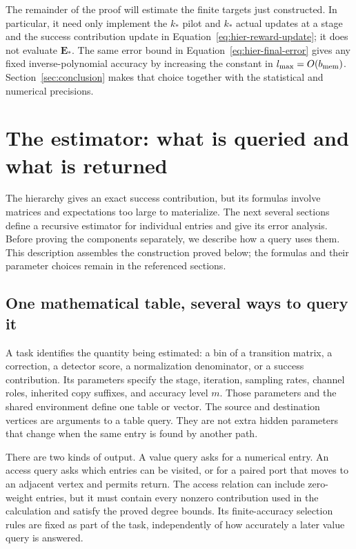 \documentclass[11pt]{article}
\numberwithin{equation}{section}
\theoremstyle{definition}
\theoremstyle{remark}
\begin{document}
The remainder of the proof will estimate the finite targets just
constructed.  In particular, it need only implement the $k_*$ pilot and
$k_*$ actual updates at a stage and the success contribution update in
Equation~\eqref{eq:hier-reward-update}; it does not evaluate ${\mathbf{E}}_*$.
The same error bound in Equation~\eqref{eq:hier-final-error} gives any
fixed inverse-polynomial accuracy by increasing the constant in
${l_{\rm max}}=O({b_{\rm mem}})$.  Section~\ref{sec:conclusion} makes that choice together with
the statistical and numerical precisions.





\section{The estimator: what is queried and what is returned}
\label{sec:estimator-description}

The hierarchy gives an exact success contribution, but its formulas involve matrices and expectations too large to materialize. The next several sections define a recursive estimator for individual entries and give its error analysis. Before proving the components separately, we describe how a query uses them. This description assembles the construction proved below; the formulas and their parameter choices remain in the referenced sections.

\subsection{One mathematical table, several ways to query it}

A task identifies the quantity being estimated: a bin of a transition matrix, a correction, a detector score, a normalization denominator, or a success contribution. Its parameters specify the stage, iteration, sampling rates, channel roles, inherited copy suffixes, and accuracy level ${m}$. Those parameters and the shared environment define one table or vector. The source and destination vertices are arguments to a table query. They are not extra hidden parameters that change when the same entry is found by another path.

There are two kinds of output. A value query asks for a numerical entry. An access query asks which entries can be visited, or for a paired port that moves to an adjacent vertex and permits return. The access relation can include zero-weight entries, but it must contain every nonzero contribution used in the calculation and satisfy the proved degree bounds. Its finite-accuracy selection rules are fixed as part of the task, independently of how accurately a later value query is answered.
\end{document}
